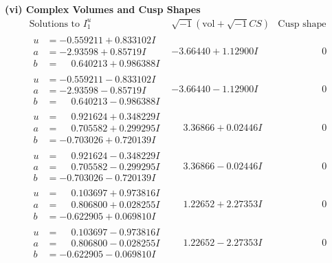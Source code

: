 \documentclass[1p]{elsarticle_modified}
\theoremstyle{definition}
\newcommand{\I}{\sqrt{-1}}
\begin{document}
\newpage\flushleft \textbf{(vi) Complex Volumes and Cusp Shapes}
$$\begin{array}{c|c|c}  
\text{Solutions to }I^u_{1}& \I (\text{vol} + \sqrt{-1}CS) & \text{Cusp shape}\\
 \hline 
\begin{aligned}
u &= -0.559211 + 0.833102 I \\
a &= -2.93598 + 0.85719 I \\
b &= \phantom{-}0.640213 + 0.986388 I\end{aligned}
 & -3.66440 + 1.12900 I & \phantom{-0.000000 } 0 \\ \hline\begin{aligned}
u &= -0.559211 - 0.833102 I \\
a &= -2.93598 - 0.85719 I \\
b &= \phantom{-}0.640213 - 0.986388 I\end{aligned}
 & -3.66440 - 1.12900 I & \phantom{-0.000000 } 0 \\ \hline\begin{aligned}
u &= \phantom{-}0.921624 + 0.348229 I \\
a &= \phantom{-}0.705582 + 0.299295 I \\
b &= -0.703026 + 0.720139 I\end{aligned}
 & \phantom{-}3.36866 + 0.02446 I & \phantom{-0.000000 } 0 \\ \hline\begin{aligned}
u &= \phantom{-}0.921624 - 0.348229 I \\
a &= \phantom{-}0.705582 - 0.299295 I \\
b &= -0.703026 - 0.720139 I\end{aligned}
 & \phantom{-}3.36866 - 0.02446 I & \phantom{-0.000000 } 0 \\ \hline\begin{aligned}
u &= \phantom{-}0.103697 + 0.973816 I \\
a &= \phantom{-}0.806800 + 0.028255 I \\
b &= -0.622905 + 0.069810 I\end{aligned}
 & \phantom{-}1.22652 + 2.27353 I & \phantom{-0.000000 } 0 \\ \hline\begin{aligned}
u &= \phantom{-}0.103697 - 0.973816 I \\
a &= \phantom{-}0.806800 - 0.028255 I \\
b &= -0.622905 - 0.069810 I\end{aligned}
 & \phantom{-}1.22652 - 2.27353 I & \phantom{-0.000000 } 0 \\ \hline\begin{aligned}

\end{aligned}
\end{array}$$
\end{document}
